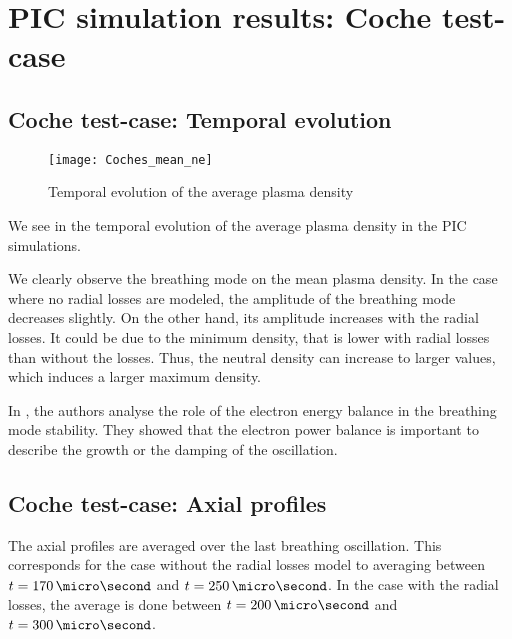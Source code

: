 
\section{PIC simulation results: Coche test-case}

\subsection{Coche test-case: Temporal evolution} \label{subsec-temp_coche}

\begin{figure}[hbtp]
  \centering
  \texttt{[image: Coches\_mean\_ne]}
  \caption{Temporal evolution of the average plasma density}
  \label{fig-coche_mean_ne}
\end{figure}

We  see in  the temporal evolution of the average plasma density in the \ac{PIC}  simulations.

We clearly observe the breathing mode on the mean plasma density.
In the case where no radial losses are modeled, the amplitude of the breathing mode decreases slightly.
On the other hand, its amplitude increases with the radial losses.
It could be due to the minimum density, that is lower with radial losses than without the losses.
Thus, the neutral density can increase to larger values, which induces a larger maximum density.

In \citet{hara2014}, the authors analyse the role of the electron energy balance in the breathing mode stability.
They showed that the electron power balance is important to describe the growth or the damping of the oscillation.


\subsection{Coche test-case: Axial profiles} \label{subsec-axial_coche}

  The axial profiles are averaged over the last breathing oscillation.
  This corresponds for the case without the radial losses model to averaging between $t=170\,\micro\second$ and $t=250\,\micro\second$.
  In the case with the radial losses, the average is done between $t=200\,\micro\second$ and $t=300\,\micro\second$.
  
